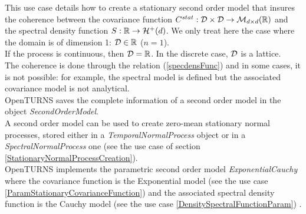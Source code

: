 \renewcommand{\filename}{docUC_StocProc_SecondOrderModel_Param.tex}
\renewcommand{\filetitle}{UC : Creation of stationary parametric second order model}

\HeaderIIILevel

\label{SecondOrderModel}


This use case details how to  create a stationary second order model that insures the coherence between the covariance function $C^{stat}:  {\mathcal D}\times {\mathcal D} \rightarrow  \mathcal{M}_{d \times d}({\mathbb R})$ and the spectral density function   $S : {\mathbb R} \rightarrow \mathcal{H}^+(d)$.
We only treat here the case where the domain is of dimension 1: ${\mathcal D} \in {\mathbb R}$ ($n=1$). \\
If the process is continuous, then ${\mathcal D}={\mathbb R}$. In the discrete case, ${\mathcal D}$  is a lattice. \\

The coherence is done through the relation (\ref{specdensFunc}) and in some cases, it is not possible:  for example, the spectral model is defined but the associated covariance model is not analytical.\\


OpenTURNS saves the complete information of a second order model in the object {\itshape SecondOrderModel}. \\

A second order model can be used to create zero-mean stationary normal processes, stored either in a {\itshape TemporalNormalProcess} object or in a {\itshape SpectralNormalProcess} one (see the use case of section \ref{StationaryNormalProcessCreation}).\\

OpenTURNS implements the parametric second order model {\itshape ExponentialCauchy} where the covariance function is the Exponential model (see the use case \ref{ParamStationaryCovarianceFunction}) and the associated spectral density function is the Cauchy model (see the use case \ref{DensitySpectralFunctionParam}) .\\


